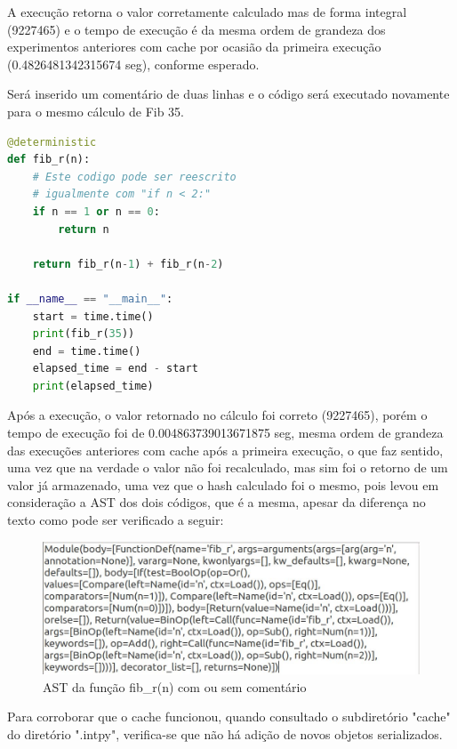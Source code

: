 \documentclass[sigconf]{acmart}
\begin{document}
A execução retorna o valor corretamente calculado mas de forma integral (9227465) e o tempo de execução é da mesma ordem de grandeza dos experimentos anteriores com cache por ocasião da primeira execução (0.4826481342315674 seg), conforme esperado.

Será inserido um comentário de duas linhas e o código será executado novamente para o mesmo cálculo de Fib 35.

\renewcommand{\lstlistingname}{Trecho de código}
\begin{lstlisting}[language=Python, caption=Adição de comentário do código anteriormente executado]
@deterministic
def fib_r(n):
    # Este codigo pode ser reescrito
    # igualmente com "if n < 2:"
    if n == 1 or n == 0:
        return n

    return fib_r(n-1) + fib_r(n-2)

if __name__ == "__main__":
    start = time.time()
    print(fib_r(35))
    end = time.time()
    elapsed_time = end - start
    print(elapsed_time)
\end{lstlisting}

Após a execução, o valor retornado no cálculo foi correto (9227465), porém o tempo de execução foi de 0.004863739013671875 seg, mesma ordem de grandeza das execuções anteriores com cache após a primeira execução, o que faz sentido, uma vez que na verdade o valor não foi recalculado, mas sim foi o retorno de um valor já armazenado, uma vez que o hash calculado foi o mesmo, pois levou em consideração a AST dos dois códigos, que é a mesma, apesar da diferença no texto como pode ser verificado a seguir:

\begin{figure}[H]
  \centering
  \includegraphics[width=\linewidth]{ast_fib_r}
  \caption{AST da função fib\_r(n) com ou sem comentário}
\end{figure}

Para corroborar que o cache funcionou, quando consultado o subdiretório "cache" do diretório ".intpy", verifica-se que não há adição de novos objetos serializados.
\end{document}

